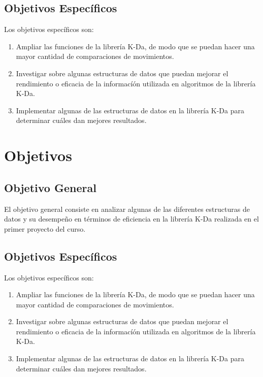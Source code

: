 \documentclass[letterpaper]{article}
\begin{document}
\subsection{Objetivos Específicos}

Los objetivos específicos son:\\

\begin{enumerate}
\item Ampliar las funciones de la librería K-Da, de modo que se puedan hacer una mayor cantidad de comparaciones de movimientos.
\item Investigar sobre algunas estructuras de datos que puedan mejorar el rendimiento o eficacia de la informacíón utilizada 
en algoritmos de la librería K-Da.
\item Implementar algunas de las estructuras de datos en la librería K-Da para determinar cuáles dan mejores resultados.
\end{enumerate}






\section{Objetivos}

\subsection{Objetivo General}


El objetivo general consiste en analizar algunas de las diferentes estructuras de datos y su desempeño en términos de eficiencia en la librería K-Da
realizada en el primer proyecto del curso.

\subsection{Objetivos Específicos}

Los objetivos específicos son:\\

\begin{enumerate}
\item Ampliar las funciones de la librería K-Da, de modo que se puedan hacer una mayor cantidad de comparaciones de movimientos.
\item Investigar sobre algunas estructuras de datos que puedan mejorar el rendimiento o eficacia de la informacíón utilizada 
en algoritmos de la librería K-Da.
\item Implementar algunas de las estructuras de datos en la librería K-Da para determinar cuáles dan mejores resultados.
\end{enumerate}
\end{document}
